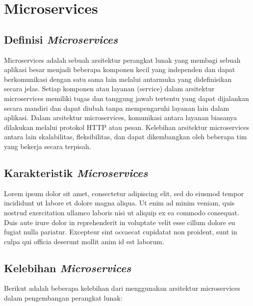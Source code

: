 \documentclass{report}
\begin{document}
	\setcounter{chapter}{11}
	\chapter{Microservices}
	
	
	\section{Definisi \textit{Microservices}}
	
	Microservices adalah sebuah arsitektur perangkat lunak yang membagi sebuah aplikasi besar menjadi beberapa komponen kecil yang independen dan dapat berkomunikasi dengan satu sama lain melalui antarmuka yang didefinisikan secara jelas. Setiap komponen atau layanan (service) dalam arsitektur microservices memiliki tugas dan tanggung jawab tertentu yang dapat dijalankan secara mandiri dan dapat diubah tanpa mempengaruhi layanan lain dalam aplikasi. Dalam arsitektur microservices, komunikasi antara layanan biasanya dilakukan melalui protokol HTTP atau pesan. Kelebihan arsitektur microservices antara lain skalabilitas, fleksibilitas, dan dapat dikembangkan oleh beberapa tim yang bekerja secara terpisah.
	
	
	\section{Karakteristik \textit{Microservices}}
	
	Lorem ipsum dolor sit amet, consectetur adipiscing elit, sed do eiusmod tempor incididunt ut labore et dolore magna aliqua. Ut enim ad minim veniam, quis nostrud exercitation ullamco laboris nisi ut aliquip ex ea commodo consequat. Duis aute irure dolor in reprehenderit in voluptate velit esse cillum dolore eu fugiat nulla pariatur. Excepteur sint occaecat cupidatat non proident, sunt in culpa qui officia deserunt mollit anim id est laborum.
	
	\section{Kelebihan \textit{Microservices}}
	Berikut adalah beberapa kelebihan dari menggunakan arsitektur microservices dalam pengembangan perangkat lunak:
	
\end{document}
